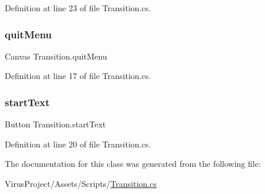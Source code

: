 Definition at line 23 of file Transition.\+cs.

\hypertarget{class_transition_ab609cd1ff603a1b4f70d1c485f791ddc}{}\label{class_transition_ab609cd1ff603a1b4f70d1c485f791ddc} 
\subsubsection{\texorpdfstring{quit\+Menu}{quitMenu}}
{\footnotesize\ttfamily Canvas Transition.\+quit\+Menu}



Definition at line 17 of file Transition.\+cs.

\hypertarget{class_transition_a4a6526330da3604fee707638f5ca9926}{}\label{class_transition_a4a6526330da3604fee707638f5ca9926} 
\subsubsection{\texorpdfstring{start\+Text}{startText}}
{\footnotesize\ttfamily Button Transition.\+start\+Text}



Definition at line 20 of file Transition.\+cs.



The documentation for this class was generated from the following file\+:\begin{DoxyCompactItemize}
\item 
Virus\+Project/\+Assets/\+Scripts/\hyperlink{_transition_8cs}{Transition.\+cs}\end{DoxyCompactItemize}
